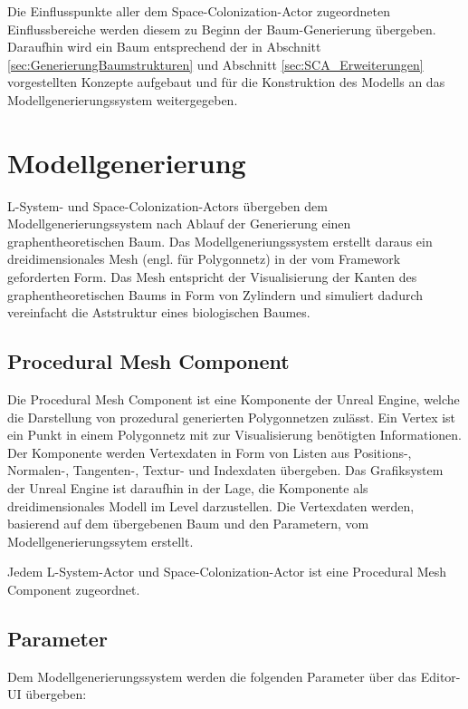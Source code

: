 Die Einflusspunkte aller dem Space-Colonization-Actor zugeordneten Einflussbereiche werden diesem zu Beginn der Baum-Generierung übergeben. Daraufhin wird ein Baum entsprechend der in Abschnitt \ref{sec:GenerierungBaumstrukturen} und Abschnitt \ref{sec:SCA_Erweiterungen} vorgestellten Konzepte aufgebaut und für die Konstruktion des Modells an das Modellgenerierungssystem weitergegeben.

\section{Modellgenerierung} \label{sec:Modellgenerierung}

L-System- und Space-Colonization-Actors übergeben dem Modellgenerierungssystem nach Ablauf der Generierung einen graphentheoretischen Baum. Das Modellgeneriungssystem erstellt daraus ein dreidimensionales Mesh (engl. für Polygonnetz) in der vom Framework geforderten Form. Das Mesh entspricht der Visualisierung der Kanten des graphentheoretischen Baums in Form von Zylindern und simuliert dadurch vereinfacht die Aststruktur eines biologischen Baumes. \cite[S.2]{SpaceColonizationAlgorithm:07} 

\subsection{Procedural Mesh Component}

Die Procedural Mesh Component ist eine Komponente der Unreal Engine, welche die Darstellung von prozedural generierten Polygonnetzen zulässt. Ein Vertex ist ein Punkt in einem Polygonnetz mit zur Visualisierung benötigten Informationen. Der Komponente werden Vertexdaten in Form von Listen aus Positions-, Normalen-, Tangenten-, Textur- und Indexdaten übergeben. Das Grafiksystem der Unreal Engine ist daraufhin in der Lage, die Komponente als dreidimensionales Modell im Level darzustellen. \cite{ProceduralMeshComponent:15} Die Vertexdaten werden, basierend auf dem übergebenen Baum und den Parametern, vom Modellgenerierungssytem erstellt.

Jedem L-System-Actor und Space-Colonization-Actor ist eine Procedural Mesh Component zugeordnet.

\subsection{Parameter} \label{subsec:Modellgenerierung_Parameter}

Dem Modellgenerierungssystem werden die folgenden Parameter über das Editor-UI übergeben:

